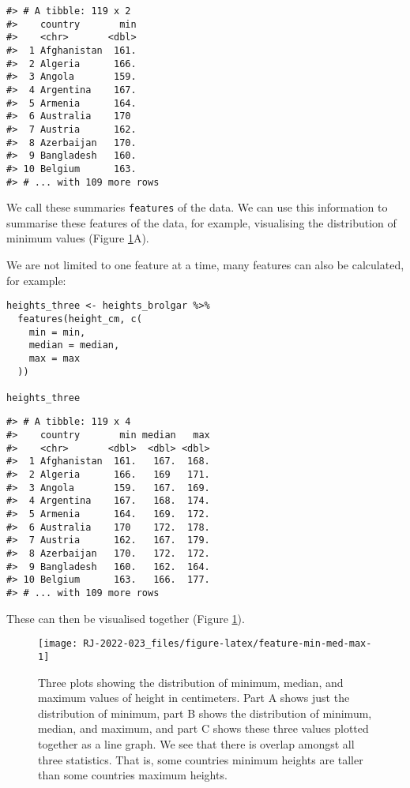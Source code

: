 \begin{verbatim}
#> # A tibble: 119 x 2
#>    country       min
#>    <chr>       <dbl>
#>  1 Afghanistan  161.
#>  2 Algeria      166.
#>  3 Angola       159.
#>  4 Argentina    167.
#>  5 Armenia      164.
#>  6 Australia    170 
#>  7 Austria      162.
#>  8 Azerbaijan   170.
#>  9 Bangladesh   160.
#> 10 Belgium      163.
#> # ... with 109 more rows
\end{verbatim}

We call these summaries \texttt{features} of the data. We can use this information to summarise these features of the data, for example, visualising the distribution of minimum values (Figure \ref{fig:feature-min-med-max}A).

We are not limited to one feature at a time, many features can also be calculated, for example:

\begin{verbatim}
heights_three <- heights_brolgar %>%
  features(height_cm, c(
    min = min,
    median = median,
    max = max
  ))

heights_three
\end{verbatim}

\begin{verbatim}
#> # A tibble: 119 x 4
#>    country       min median   max
#>    <chr>       <dbl>  <dbl> <dbl>
#>  1 Afghanistan  161.   167.  168.
#>  2 Algeria      166.   169   171.
#>  3 Angola       159.   167.  169.
#>  4 Argentina    167.   168.  174.
#>  5 Armenia      164.   169.  172.
#>  6 Australia    170    172.  178.
#>  7 Austria      162.   167.  179.
#>  8 Azerbaijan   170.   172.  172.
#>  9 Bangladesh   160.   162.  164.
#> 10 Belgium      163.   166.  177.
#> # ... with 109 more rows
\end{verbatim}

These can then be visualised together (Figure \ref{fig:feature-min-med-max}).

\begin{figure}

{\centering \texttt{[image: RJ-2022-023\_files/figure-latex/feature-min-med-max-1]} 

}

\caption{Three plots showing the distribution of minimum, median, and maximum values of height in centimeters. Part A shows just the distribution of minimum, part B shows the distribution of minimum, median, and maximum, and part C shows these three values plotted together as a line graph. We see that there is overlap amongst all three statistics. That is, some countries minimum heights are taller than some countries maximum heights.}\label{fig:feature-min-med-max}
\end{figure}

